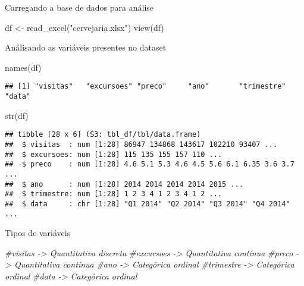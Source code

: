 \documentclass[
]{article}
\newenvironment{Shaded}{\begin{snugshade}}{\end{snugshade}}
\newcommand{\CommentTok}[1]{\textcolor[rgb]{0.56,0.35,0.01}{\textit{#1}}}
\newcommand{\FunctionTok}[1]{\textcolor[rgb]{0.00,0.00,0.00}{#1}}
\newcommand{\NormalTok}[1]{#1}
\newcommand{\OtherTok}[1]{\textcolor[rgb]{0.56,0.35,0.01}{#1}}
\newcommand{\StringTok}[1]{\textcolor[rgb]{0.31,0.60,0.02}{#1}}
\begin{document}
Carregando a base de dados para análise

\begin{Shaded}
\begin{Highlighting}[]
\NormalTok{df }\OtherTok{\textless{}{-}} \FunctionTok{read\_excel}\NormalTok{(}\StringTok{"cervejaria.xlsx"}\NormalTok{)}
\FunctionTok{view}\NormalTok{(df)}
\end{Highlighting}
\end{Shaded}

Análisando as variáveis presentes no dataset

\begin{Shaded}
\begin{Highlighting}[]
\FunctionTok{names}\NormalTok{(df)}
\end{Highlighting}
\end{Shaded}

\begin{verbatim}
## [1] "visitas"   "excursoes" "preco"     "ano"       "trimestre" "data"
\end{verbatim}

\begin{Shaded}
\begin{Highlighting}[]
\FunctionTok{str}\NormalTok{(df)}
\end{Highlighting}
\end{Shaded}

\begin{verbatim}
## tibble [28 x 6] (S3: tbl_df/tbl/data.frame)
##  $ visitas  : num [1:28] 86947 134868 143617 102210 93407 ...
##  $ excursoes: num [1:28] 115 135 155 157 110 ...
##  $ preco    : num [1:28] 4.6 5.1 5.3 4.6 4.5 5.6 6.1 6.35 3.6 3.7 ...
##  $ ano      : num [1:28] 2014 2014 2014 2014 2015 ...
##  $ trimestre: num [1:28] 1 2 3 4 1 2 3 4 1 2 ...
##  $ data     : chr [1:28] "Q1 2014" "Q2 2014" "Q3 2014" "Q4 2014" ...
\end{verbatim}

Tipos de variáveis

\begin{Shaded}
\begin{Highlighting}[]
\CommentTok{\#visitas {-}\textgreater{} Quantitativa discreta}
\CommentTok{\#excursoes {-}\textgreater{} Quantitativa contínua}
\CommentTok{\#preco {-}\textgreater{} Quantitativa contínua}
\CommentTok{\#ano {-}\textgreater{} Categórica ordinal}
\CommentTok{\#trimestre {-}\textgreater{} Categórica ordinal}
\CommentTok{\#data {-}\textgreater{} Categórica ordinal}
\end{Highlighting}
\end{Shaded}
\end{document}
